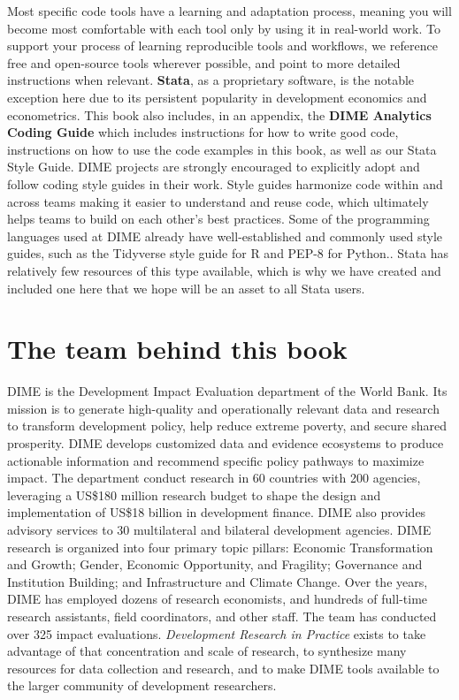Most specific code tools have a learning and adaptation process,
meaning you will become most comfortable with each tool
only by using it in real-world work.
To support your process of learning reproducible tools and workflows,
we reference free and open-source tools wherever possible,
and point to more detailed instructions when relevant.
\textbf{Stata},
as a proprietary software, is the notable exception here
due to its persistent popularity in development economics and econometrics.
This book also includes, in an appendix,
the \textbf{DIME Analytics Coding Guide}
which includes instructions for how to write good code,
instructions on how to use the code examples in this book,
as well as our Stata Style Guide.
DIME projects are strongly encouraged to
explicitly adopt and follow coding style guides in their work.
Style guides harmonize code within and across teams
making it easier to understand and reuse code,
which ultimately helps teams to
build on each other's best practices.
Some of the programming languages used at DIME
already have well-established and commonly used style guides,
such as the Tidyverse style guide for R
and PEP-8 for Python..
Stata has relatively few resources of this type available,
which is why we have created and included one here that
we hope will be an asset to all Stata users.

\section{The team behind this book}
DIME is the Development Impact Evaluation department of the World Bank.
Its mission is to generate high-quality and operationally relevant data and research
to transform development policy, help reduce extreme poverty, and secure shared prosperity.
DIME develops customized data and evidence ecosystems to produce actionable information
and recommend specific policy pathways to maximize impact.
The department conduct research in 60 countries with 200 agencies, leveraging a
US\$180 million research budget to shape the design and implementation of
US\$18 billion in development finance.
DIME also provides advisory services to 30 multilateral and bilateral development agencies.
DIME research is organized into four primary topic pillars:
Economic Transformation and Growth;
Gender, Economic Opportunity, and Fragility;
Governance and Institution Building;
and Infrastructure and Climate Change.
Over the years, DIME has employed dozens of research economists,
and hundreds of full-time research assistants, field coordinators, and other staff.
The team has conducted over 325 impact evaluations.
\textit{Development Research in Practice} exists to take advantage of that concentration and scale of research,
to synthesize many resources for data collection and research,
and to make DIME tools available to the larger community of development researchers.

